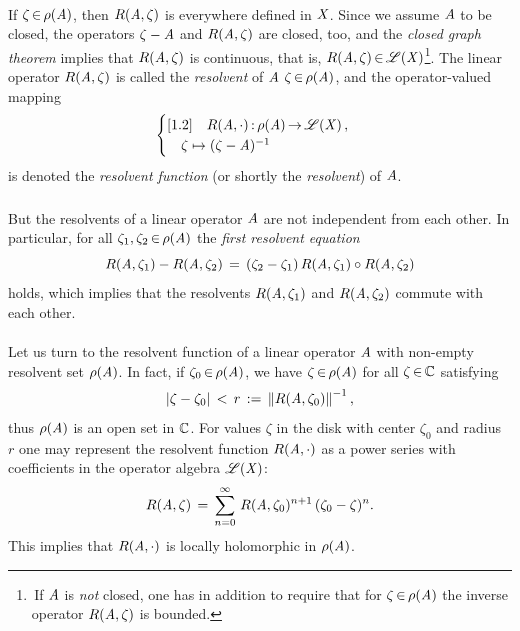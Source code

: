 \documentclass[11pt,twoside]{article}
\begin{document}
\paragraph{} %
If $\zeta {\,\in\,} \rho(\mathit{A})$,
then $R(\mathit{A},\zeta)$ is everywhere defined in $\mathit{X}$.
Since we assume $\mathit{A}$ to be closed,
the operators $\zeta -\mathit{A} $ and $R(\mathit{A},\zeta)$ are closed,
too,
and the \textit{closed graph theorem}
implies that $R(\mathit{A},\zeta)$ is continuous,
that is,
$R(\mathit{A},\zeta) {\,\in\,} \mathscr{L}(\mathit{X})$\footnote{
\,If $\mathit{A}$ is \textit{not} closed,
one has in addition to require that
for $\zeta {\,\in\,} \rho(\mathit{A})$ the inverse operator $R(\mathit{A},\zeta)$
is bounded.}.
The linear operator $R(\mathit{A},\zeta)$ is called the \textit{resolvent}
of $\mathit{A}$ {\wrt} $\zeta {\,\in\,} \rho(\mathit{A})$,
and the operator-valued mapping
\begin{equation}\label{VI_RESOLVENT_FUNCTION}
\begin{cases}[1.2]
\quad R(\mathit{A},\cdot) {\,:\,} \rho(\mathit{A}) {\,\to\,} \mathscr{L}(\mathit{X})\,,\\
\quad \zeta \mapsto (\zeta - \mathit{A})^{-1} \\
\end{cases}
\end{equation}
is denoted the \textit{resolvent function} (or shortly the \textit{resolvent})
of $\mathit{A}$.

\subparagraph{}
But the resolvents of a linear operator $\mathit{A}$ are not independent
from each other.
In particular,
for all $\zeta_1,\zeta_2 {\,\in\,} \rho(\mathit{A})$
the \textit{first resolvent equation}
\begin{equation}\label{VI_RESOLVENT_EQUATION}
R(\mathit{A},\zeta_1) - R(\mathit{A},\zeta_2)
\,=\,
(\zeta_2-\zeta_1) \, R(\mathit{A},\zeta_1) \circ R(\mathit{A},\zeta_2)
\end{equation}
holds,
which implies that
the resolvents $R(\mathit{A},\zeta_1)$ and $R(\mathit{A},\zeta_2)$
commute with each other.

\paragraph{}
Let us turn to the resolvent function of a linear operator $\mathit{A}$
with non-empty resolvent set $\rho(\mathit{A})$.
In fact,
if $\zeta_0 {\,\in\,} \rho(\mathit{A})$,
we have $\zeta {\,\in\,} \rho(\mathit{A})$ for all $\zeta {\,\in\,} {\mathbb{C}}$ satisfying
\[
\abs{\zeta - \zeta_0 } \, < \, r \eqdef \norm{R(\linA,\zeta_0)}^{-1},
\]
thus $\rho(\mathit{A})$ is an open set in ${\mathbb{C}}$.
For values $\zeta$ in the disk with center $\zeta_0$ and radius $r$
one may represent the resolvent function $R(\mathit{A},\cdot)$ as a power series
with coefficients in the operator algebra $\mathscr{L}(\mathit{X})$:
\[
R(\mathit{A},\zeta) \,=\,
\sum_{n=0}^{\infty} \, R(\mathit{A},\zeta_0)^{n+1} \, (\zeta_0-\zeta)^n.
\]
This implies that
$R(\mathit{A},\cdot)$ is locally holomorphic in $\rho(\mathit{A})$.
\end{document}

